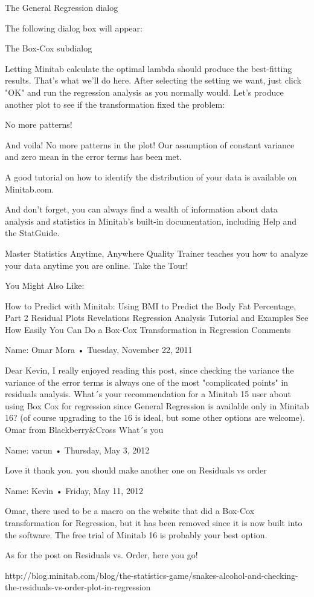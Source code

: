 The General Regression dialog


The following dialog box will appear: 


The Box-Cox subdialog


Letting Minitab calculate the optimal lambda should produce the best-fitting results. That's what we'll do here.  After selecting the setting we want, just click "OK" and run the regression analysis as you normally would. Let's produce another plot to see if the transformation fixed the problem:


No more patterns!


And voila! No more patterns in the plot! Our assumption of constant variance and zero mean in the error terms has been met.

A good tutorial on how to identify the distribution of your data is available on Minitab.com. 

And don't forget, you can always find a wealth of information about data analysis and statistics in Minitab's built-in documentation, including Help and the StatGuide.


 

Master Statistics Anytime, Anywhere
Quality Trainer teaches you how to analyze your data anytime you are online.
Take the Tour!


 
You Might Also Like:

How to Predict with Minitab: Using BMI to Predict the Body Fat Percentage, Part 2
Residual Plots Revelations
Regression Analysis Tutorial and Examples
See How Easily You Can Do a Box-Cox Transformation in Regression
Comments

Name: Omar Mora • Tuesday, November 22, 2011

Dear Kevin,
I really enjoyed reading this post, since checking the variance the variance of the error terms is always one of the most "complicated points" in residuals analysis.
What´s your recommendation for a Minitab 15 user about using Box Cox for regression since General Regression is available only in Minitab 16? (of course upgrading to the 16 is ideal, but some other options are welcome). Omar from Blackberry&Cross
What´s you

Name: varun • Thursday, May 3, 2012

Love it thank you. you should make another one 
on 
Residuals vs order

Name: Kevin • Friday, May 11, 2012

Omar, there used to be a macro on the website that did a Box-Cox transformation for Regression, but it has been removed since it is now built into the software. The free trial of Minitab 16 is probably your best option.

As for the post on Residuals vs. Order, here you go!

http://blog.minitab.com/blog/the-statistics-game/snakes-alcohol-and-checking-the-residuals-vs-order-plot-in-regression

